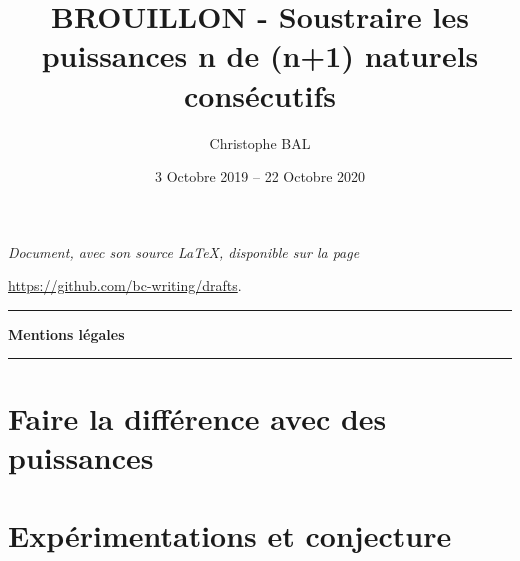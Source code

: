 \documentclass[12pt]{amsart}
\begin{document}
\title{BROUILLON - Soustraire les puissances n\ieme{} de (n+1) naturels consécutifs}
\author{Christophe BAL}
\date{3 Octobre 2019 -- 22 Octobre 2020}

\maketitle

\begin{center}
	\itshape
	Document, avec son source \LaTeX, disponible sur la page
	
	\url{https://github.com/bc-writing/drafts}.
\end{center}


\bigskip


\begin{center}
	\hrule\vspace{.3em}
	{
		\fontsize{1.35em}{1em}\selectfont
		\textbf{Mentions \og légales \fg}
	}
			
	\vspace{0.45em}
	\doclicenseThis
	\hrule
\end{center}


\bigskip
\setcounter{tocdepth}{1}
\tableofcontents



\newpage
\section{Faire la différence avec des puissances}






\newpage
\section{Expérimentations et conjecture}





\newpage
%
%
%
%
%
%
%
%
%
%
%
%
\end{document}
